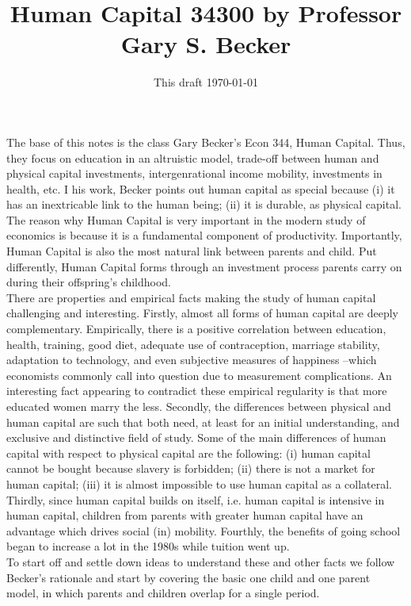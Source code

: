 



\title{Human Capital 34300 by Professor Gary S. Becker}
\author{}
\date{This draft \today}
\maketitle


\noindent The base of this notes is the class Gary Becker's Econ 344, Human Capital. Thus, they focus on education in an altruistic model, trade-off between human and physical capital investments, intergenrational income mobility, investments in health, etc. I his work, Becker points out human capital as special because (i) it has an inextricable link to the human being; (ii) it is durable, as physical capital. The reason why Human Capital is very important in the modern study of economics is because it is a fundamental component of productivity. Importantly, Human Capital is also the most natural link between parents and child. Put differently, Human Capital forms through an investment process parents carry on during their offspring's childhood.\\
\indent There are properties and empirical facts making the study of human capital challenging and interesting. Firstly, almost all forms of human capital are deeply complementary. Empirically, there is a positive correlation between education, health, training, good diet, adequate use of contraception,  marriage stability, adaptation to technology, and even subjective measures of happiness --which economists commonly call into question due to measurement complications. An interesting fact appearing to contradict these empirical regularity is that more educated women marry the less. Secondly, the differences between physical and human capital are such that both need, at least for an initial understanding, and exclusive and distinctive field of study. Some of the main differences of human capital with respect to physical capital are the following: (i) human capital cannot be bought because slavery is forbidden; (ii) there is not a market for human capital; (iii) it is almost impossible to use human capital as a collateral. Thirdly, since human capital builds on itself, i.e. human capital is intensive in human capital, children from parents with greater human capital have an advantage which drives social (in) mobility. Fourthly, the benefits of going school began to increase a lot in the 1980s while tuition went up.\\  
\indent To start off and settle down ideas to understand these and other facts we follow Becker's rationale and start by covering the basic one child and one parent model, in which parents and children overlap for a single period.


